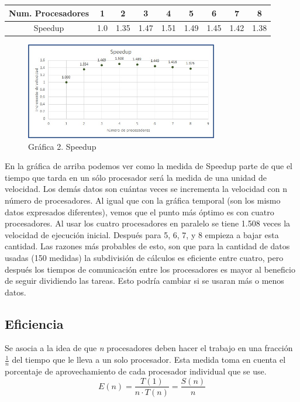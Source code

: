 \documentclass{report}
\begin{document}
\vspace{0.5cm}

\begin{center}
    \begin{tabular}{|c|c|c|c|c|c|c|c|c|}
        \hline
           Num. Procesadores & 1 & 2 & 3 & 4 & 5 & 6 & 7 & 8 \\
        \hline
            Speedup & 1.0 & 1.35 & 1.47 & 1.51 & 1.49 & 1.45 & 1.42 & 1.38 \\
        \hline
    \end{tabular}
\end{center}

\vspace{0.5cm}

\begin{figure}[h!]
    \centering
    \includegraphics[width = 0.75\textwidth]{Images/Speedup.jpeg}
    \caption{Gráfica 2. Speedup}
\end{figure}

\vspace{0.2cm}

En la gráfica de arriba podemos ver como la medida de Speedup parte de que el tiempo que tarda en un sólo procesador será la medida de una unidad de velocidad. Los demás datos son cuántas veces se incrementa la velocidad con n número de procesadores. Al igual que con la gráfica temporal (son los mismo datos expresados diferentes), vemos que el punto más óptimo es con cuatro procesadores. Al usar los cuatro procesadores en paralelo se tiene 1.508 veces la velocidad de ejecución inicial. Después para 5, 6, 7, y 8 empieza a bajar esta cantidad. Las razones más probables de esto, son que para la cantidad de datos usadas (150 medidas) la subdivisión de cálculos es eficiente entre cuatro, pero después los tiempos de comunicación entre los procesadores es mayor al beneficio de seguir dividiendo las tareas. Esto podría cambiar si se usaran más o menos datos.

\clearpage
\subsection*{Eficiencia}
\noindent Se asocia a la idea de que \textit{n} procesadores deben hacer el trabajo en una fracción \textit{$\frac{1}{n}$} del tiempo que le lleva a un solo procesador. Esta medida toma en cuenta el porcentaje de aprovechamiento de cada procesador individual que se use.\medskip
\begin{equation*}
    E(n) = \frac{T(1)}{n \cdot T(n)} = \frac{S(n)}{n}
\end{equation*}
\end{document}
